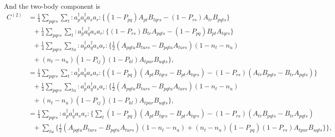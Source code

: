 \documentclass[12pt]{article}
\begin{document}
\noindent And the two-body component is
\begin{align}
C^{(2)} &= \frac{1}{4} \sum_{pqrs}\sum_t :a_p^\dagger a_q^\dagger a_s a_r : \{ (1-P_{pq})A_{pt}B_{tqrs} -(1-P_{rs})A_{tr}B_{pqts}\} \\
& \ \ \ + \frac{1}{4} \sum_{pqrs}\sum_t :a_p^\dagger a_q^\dagger a_s a_r : \{(1-P_{rs})B_{tr}A_{pqts} -  (1-P_{pq})B_{pt}A_{tqrs}\}\\
& \ \ \ + \frac{1}{4} \sum_{pqrs}\sum_{tu} :a_p^\dagger a_q^\dagger a_s a_r : \Big\{ \frac{1}{2} (A_{pqtu}B_{turs}-B_{pqtu}A_{turs})(1-n_t-n_u)\\ 
& \ \ \  +  (n_t-n_u)(1-P_{ij})(1-P_{kl})A_{tpur}B_{uqts} \Big\},\\
&= \frac{1}{4} \sum_{pqrs}\sum_t :a_p^\dagger a_q^\dagger a_s a_r : \{ (1-P_{pq})(A_{pt}B_{tqrs}-B_{pt}A_{tqrs}) -(1-P_{rs})(A_{tr}B_{pqts}-B_{tr}A_{pqts})\} \\
& \ \ \ + \frac{1}{4} \sum_{pqrs}\sum_{tu} :a_p^\dagger a_q^\dagger a_s a_r : \Big\{ \frac{1}{2} (A_{pqtu}B_{turs}-B_{pqtu}A_{turs})(1-n_t-n_u)\\ 
& \ \ \  +  (n_t-n_u)(1-P_{ij})(1-P_{kl})A_{tpur}B_{uqts} \Big\},\\
&= \frac{1}{4} \sum_{pqrs} :a_p^\dagger a_q^\dagger a_s a_r : \Big\{ \sum_t  (1-P_{pq})(A_{pt}B_{tqrs}-B_{pt}A_{tqrs}) -(1-P_{rs})(A_{tr}B_{pqts}-B_{tr}A_{pqts}) \\
& \ \ \ +  \sum_{tu} \big\{ \frac{1}{2}(A_{pqtu}B_{turs}-B_{pqtu}A_{turs})(1-n_t-n_u) +(n_t-n_u)(1-P_{pq})(1-P_{rs})A_{tpur}B_{uqts} \big\} \Big\},\\
\end{align}
\end{document}
